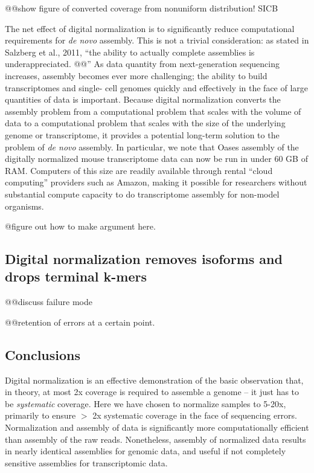 \documentclass[10pt]{article}
\begin{document}
@@show figure of converted coverage from nonuniform distribution! SICB

The net effect of digital normalization is to significantly reduce
computational requirements for {\em de novo} assembly.  This is not a
trivial consideration: as stated in Salzberg et al., 2011, ``the
ability to actually complete assemblies is underappreciated. @@'' As
data quantity from next-generation sequencing increases, assembly
becomes ever more challenging; the ability to build transcriptomes and
single- cell genomes quickly and effectively in the face of large
quantities of data is important.  Because digital normalization
converts the assembly problem from a computational problem that scales
with the volume of data to a computational problem that scales with
the size of the underlying genome or transcriptome, it provides a
potential long-term solution to the problem of {\em de novo} assembly.
In particular, we note that Oases assembly of the digitally normalized
mouse transcriptome data can now be run in under 60 GB of RAM.
Computers of this size are readily available through rental ``cloud
computing'' providers such as Amazon, making it possible for
researchers without substantial compute capacity to do transcriptome
assembly for non-model organisms.

@figure out how to make argument here.

\subsection*{Digital normalization removes isoforms and drops terminal k-mers}

@@discuss failure mode

@@retention of errors at a certain point.

\subsection*{Conclusions}

Digital normalization is an effective demonstration of the basic
observation that, in theory, at most 2x coverage is required to
assemble a genome -- it just has to be {\em systematic} coverage.
Here we have chosen to normalize samples to 5-20x, primarily to ensure
$>$ 2x systematic coverage in the face of sequencing errors.
Normalization and assembly of data is significantly more
computationally efficient than assembly of the raw reads.
Nonetheless, assembly of normalized data results in nearly identical
assemblies for genomic data, and useful if not completely sensitive
assemblies for transcriptomic data.
\end{document}
